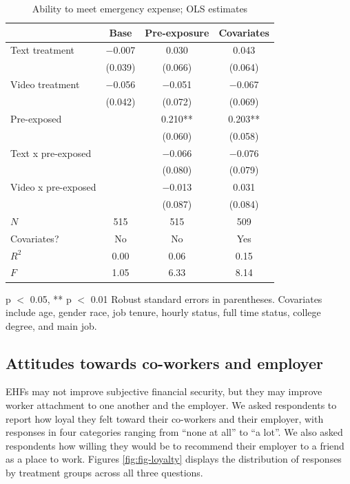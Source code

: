 \documentclass[
  11pt,
  oneside]{article}
\begin{document}
\begin{table}
\centering
\caption{\label{tab:tab-finsec}Ability to meet emergency expense; OLS estimates \label{tab:tab-finsec}}
\centering
\begin{threeparttable}
\begin{tabular}[t]{lccc}
\toprule
  & Base & Pre-exposure & Covariates\\
\midrule
Text treatment & \num{-0.007} & \num{0.030} & \num{0.043}\\
 & (\num{0.039}) & (\num{0.066}) & (\num{0.064})\\
Video treatment & \num{-0.056} & \num{-0.051} & \num{-0.067}\\
 & (\num{0.042}) & (\num{0.072}) & (\num{0.069})\\
Pre-exposed &  & \num{0.210}** & \num{0.203}**\\
 &  & (\num{0.060}) & (\num{0.058})\\
Text x pre-exposed &  & \num{-0.066} & \num{-0.076}\\
 &  & (\num{0.080}) & (\num{0.079})\\
Video x pre-exposed &  & \num{-0.013} & \num{0.031}\\
 &  & (\num{0.087}) & (\num{0.084})\\
\midrule
$N$ & \num{515} & \num{515} & \num{509}\\
Covariates? & No & No & Yes\\
$R^2$ & \num{0.00} & \num{0.06} & \num{0.15}\\
$F$ & \num{1.05} & \num{6.33} & \num{8.14}\\
\bottomrule
\end{tabular}
\begin{tablenotes}
\item * p $<$ 0.05, ** p $<$ 0.01 Robust standard errors in parentheses. Covariates include age, gender race, job tenure, hourly status, full time status, college degree, and main job.
\end{tablenotes}
\end{threeparttable}
\end{table}

\subsection{Attitudes towards co-workers and employer}\label{attitudes-towards-co-workers-and-employer}

EHFs may not improve subjective financial security, but they may improve worker attachment to one another and the employer. We asked respondents to report how loyal they felt toward their co-workers and their employer, with responses in four categories ranging from ``none at all'' to ``a lot''. We also asked respondents how willing they would be to recommend their employer to a friend as a place to work. Figures \ref{fig:fig-loyalty} displays the distribution of responses by treatment groups across all three questions.
\end{document}
